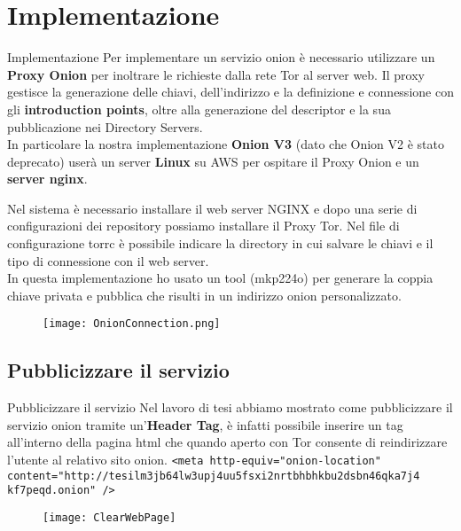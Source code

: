 \section{Implementazione}
\begin{frame}{Implementazione}
    Per implementare un servizio onion è necessario utilizzare un \textbf{Proxy Onion} per inoltrare le richieste dalla rete Tor al server web. Il proxy gestisce la generazione delle chiavi, dell'indirizzo e la definizione e connessione con gli \textbf{introduction points}, oltre alla generazione del descriptor e la sua pubblicazione nei Directory Servers. \\
    In particolare la nostra implementazione \textbf{Onion V3} (dato che Onion V2 è stato deprecato) userà un server \textbf{Linux} su AWS per ospitare il Proxy Onion e un \textbf{server nginx}.
\end{frame}

\begin{frame}
    Nel sistema è necessario installare il web server NGINX e dopo una serie di configurazioni dei repository possiamo installare il Proxy Tor. Nel file di configurazione torrc è possibile indicare la directory in cui salvare le chiavi e il tipo di connessione con il web server. \\
    In questa implementazione ho usato un tool (mkp224o) per generare la coppia chiave privata e pubblica che risulti in un indirizzo onion personalizzato.
\end{frame}

\begin{frame}
    \begin{figure}
        \centering
        \texttt{[image: OnionConnection.png]}
    \end{figure}
\end{frame}

\subsection{Pubblicizzare il servizio}
\begin{frame}{Pubblicizzare il servizio}
    Nel lavoro di tesi abbiamo mostrato come pubblicizzare il servizio onion tramite un'\textbf{Header Tag}, è infatti possibile inserire un tag all'interno della pagina html che quando aperto con Tor consente di reindirizzare l'utente al relativo sito onion.
    \lstinline{<meta http-equiv="onion-location" content="http://tesilm3jb64lw3upj4uu5fsxi2nrtbhbhkbu2dsbn46qka7j4 kf7peqd.onion" />}
\end{frame}

\begin{frame}
    \begin{figure}
        \centering
        \texttt{[image: ClearWebPage]}
    \end{figure}
\end{frame}

